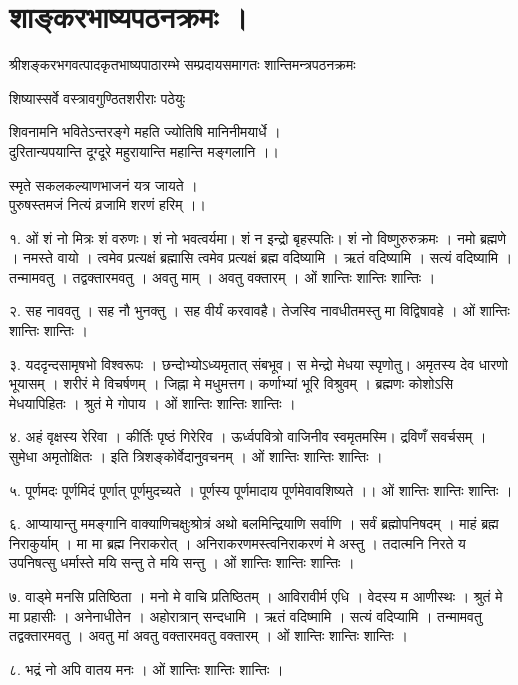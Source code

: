 ﻿\chapter{शाङ्करभाष्यपठनक्रमः ।}
श्रीशङ्करभगवत्पादकृतभाष्यपाठारम्भे सम्प्रदायसमागतः शान्तिमन्त्रपठनक्रमः 

शिष्यास्सर्वे वस्त्रावगुण्ठितशरीराः पठेयुः 

शिवनामनि भवितेऽन्तरङ्गे महति ज्योतिषि मानिनीमयार्धे । \\
दुरितान्यपयान्ति दूग्दूरे महुरायान्ति महान्ति मङ्गलानि ।।

स्मृते सकलकल्याणभाजनं यत्र जायते । \\
पुरुषस्तमजं नित्यं व्रजामि शरणं हरिम् ।। 

१. ओं शं नो मित्रः शं वरुणः। शं नो भवत्वर्यमा। शं न इन्द्रो बृहस्पतिः। शं नो विष्णुरुरुक्रमः । नमो ब्रह्मणे । नमस्ते वायो । त्वमेव प्रत्यक्षं ब्रह्मासि त्वमेव प्रत्यक्षं ब्रह्म वदिष्यामि । ऋतं वदिष्यामि । सत्यं वदिष्यामि । तन्मामवतु । तद्वक्तारमवतु । अवतु माम् । अवतु वक्तारम् । ओं शान्तिः शान्तिः शान्तिः । 

२. सह नाववतु । सह नौ भुनक्तु । सह वीर्यं करवावहै। तेजस्वि नावधीतमस्तु मा विद्विषावहे । ओं शान्तिः शान्तिः शान्तिः ।

३. यददृन्दसामृषभो विश्वरूपः । छन्दोभ्योऽध्यमृतात् संबभूव। स मेन्द्रो मेधया स्पृणोतु। अमृतस्य देव धारणो भूयासम् । शरीरं मे विचर्षणम् । जिह्ना मे मधुमत्तग। कर्णाभ्यां भूरि विश्रुवम् । ब्रह्मणः कोशोऽसि मेधयापिहितः । श्रुतं मे गोपाय । ओं शान्तिः शान्तिः शान्तिः ।

४. अहं वृक्षस्य रेरिवा । कीर्तिः पृष्ठं गिरेरिव । ऊर्ध्वपवित्रो वाजिनीव स्वमृतमस्मि। द्रविणँ सवर्चसम् । सुमेधा अमृतोक्षितः । इति त्रिशङ्कोर्वेदानुवचनम् । ओं शान्तिः शान्तिः शान्तिः ।

५. पूर्णमदः पूर्णमिदं पूर्णात् पूर्णमुदच्यते ।
पूर्णस्य पूर्णमादाय पूर्णमेवावशिष्यते ।।
ओं शान्तिः शान्तिः शान्तिः ।

६. आप्यायान्तु ममङ्गानि वाक्याणिचक्षुःश्रोत्रं अथो बलमिन्द्रियाणि सर्वाणि । सर्वं ब्रह्मोपनिषदम् । माहं ब्रह्म निराकुर्याम् । मा मा ब्रह्म निराकरोत् । अनिराकरणमस्त्वनिराकरणं मे अस्तु । तदात्मनि निरते य उपनिषत्सु धर्मास्ते मयि सन्तु ते मयि सन्तु । ओं शान्तिः शान्तिः शान्तिः ।

७. वाड्मे मनसि प्रतिष्ठिता । मनो  मे वाचि प्रतिष्ठितम् । आविरावीर्म एधि । वेदस्य म आणीस्थः । श्रुतं मे मा प्रहासीः । अनेनाधीतेन । अहोरात्रान् सन्दधामि । ऋतं वदिष्मामि । सत्यं वदिप्यामि । तन्मामवतु तद्वक्तारमवतु । अवतु मां अवतु वक्तारमवतु वक्तारम् । ओं शान्तिः शान्तिः शान्तिः ।

८. भद्रं नो अपि वातय मनः । ओं शान्तिः शान्तिः शान्तिः ।

